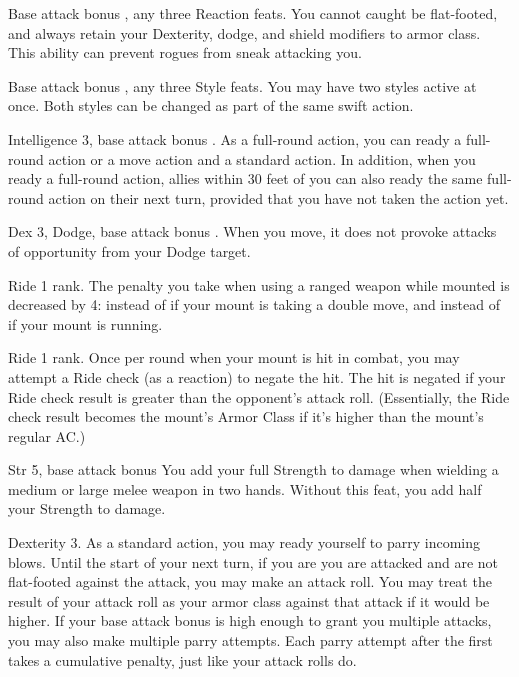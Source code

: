 \featpre Base attack bonus , any three Reaction feats.
\featben You cannot caught be flat-footed, and always retain your Dexterity, dodge, and shield modifiers to armor class. This ability can prevent rogues from sneak attacking you.

\featpre Base attack bonus , any three Style feats.
\featben You may have two styles active at once. Both styles can be changed as part of the same swift action.

\featpre Intelligence 3, base attack bonus .
\featben As a full-round action, you can ready a full-round action or a move action and a standard action. In addition, when you ready a full-round action, allies within 30 feet of you can also ready the same full-round action on their next turn, provided that you have not taken the action yet.

 Dex 3, Dodge, base attack bonus .
 When you move, it does not provoke attacks of opportunity from your Dodge target.

\featpre Ride 1 rank.
 The penalty you take when using a ranged weapon while mounted is decreased by 4:  instead of  if your mount is taking a double move, and  instead of  if your mount is running.

 Ride 1 rank.
 Once per round when your mount is hit in combat, you may attempt a Ride check (as a reaction) to negate the hit. The hit is negated if your Ride check result is greater than the opponent's attack roll. (Essentially, the Ride check result becomes the mount's Armor Class if it's higher than the mount's regular AC.)%

 Str 5, base attack bonus 
 You add your full Strength to damage when wielding a medium or large melee weapon in two hands.
 Without this feat, you add half your Strength to damage.

\featpre Dexterity 3.
\featben As a standard action, you may ready yourself to parry incoming blows. Until the start of your next turn, if you are you are attacked and are not flat-footed against the attack, you may make an attack roll. You may treat the result of your attack roll as your armor class against that attack if it would be higher. If your base attack bonus is high enough to grant you multiple attacks, you may also make multiple parry attempts. Each parry attempt after the first takes a cumulative  penalty, just like your attack rolls do.

